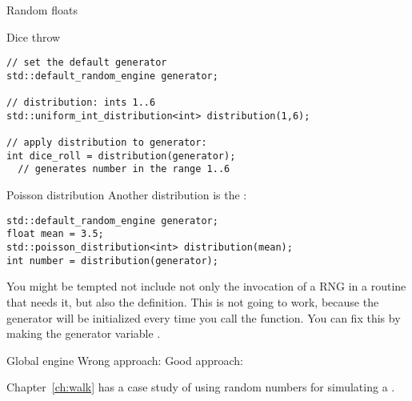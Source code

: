 \begin{block}{Random floats}
  \label{sl:stl:rand}
\end{block}

\begin{block}{Dice throw}
  \label{sl:stl:rand16}
\begin{lstlisting}
// set the default generator
std::default_random_engine generator;

// distribution: ints 1..6
std::uniform_int_distribution<int> distribution(1,6);

// apply distribution to generator:
int dice_roll = distribution(generator);
  // generates number in the range 1..6 
\end{lstlisting}
\end{block}

\begin{block}{Poisson distribution}
  \label{sl:st:poisson}
  Another distribution is the :
\begin{lstlisting}
std::default_random_engine generator;
float mean = 3.5;
std::poisson_distribution<int> distribution(mean);
int number = distribution(generator);
\end{lstlisting}
\end{block}

You might be tempted not include not only the invocation of a \ac{RNG}
in a routine that needs it,
but also the definition.
This is not going to work, because the generator will be initialized
every time you call the function.
You can fix this by making the generator variable .

\begin{block}{Global engine}
  \label{sl:static-random}
  Wrong approach:
  Good approach:
\end{block}

\begin{exercise}
  Chapter~\ref{ch:walk} has a case study of using random numbers
  for simulating a .
\end{exercise}

